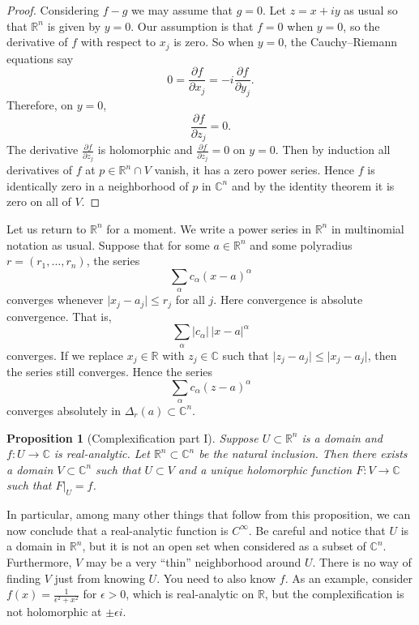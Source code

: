 \documentclass[12pt,openany]{book}
\newcommand{\sabs}[1]{\lvert {#1} \rvert}
\newcommand{\C}{{\mathbb{C}}}
\newcommand{\R}{{\mathbb{R}}}
\theoremstyle{plain}
\newtheorem{prop}[thm]{Proposition}
\theoremstyle{remark}
\theoremstyle{definition}
\theoremstyle{exercise}
\theoremstyle{example}
\begin{document}
\begin{proof}
Considering $f-g$ we may assume that $g=0$.
Let $z = x+iy$ as usual so that $\R^n$ is given by $y=0$.
Our assumption is that $f = 0$ when $y=0$,
so the derivative of $f$ with respect to $x_j$ is zero.
So when $y=0$,
the Cauchy--Riemann equations say
\begin{equation*}
0 = \frac{\partial f}{\partial x_j} =
-i \frac{\partial f}{\partial y_j} .
\end{equation*}
Therefore, on $y=0$,
\begin{equation*}
\frac{\partial f }{\partial z_j} = 0 .
\end{equation*}
The derivative $\frac{\partial f }{\partial z_j}$ is holomorphic
and $\frac{\partial f }{\partial z_j} = 0$ on $y=0$.  Then
by induction all derivatives of $f$ at $p \in \R^n \cap V$ vanish, it has a zero 
power series.  Hence $f$ is identically zero in a neighborhood of
$p$ in $\C^n$ and by the identity theorem it is zero on all of $V$.
\end{proof}


Let us return to $\R^n$ for a moment.
We write a power series in $\R^n$ in multinomial notation as usual.
Suppose that for some
$a \in \R^n$
and some polyradius
$r=(r_1,\ldots,r_n)$,
the series
\begin{equation*}
\sum_{\alpha} c_{\alpha} {(x-a)}^\alpha
\end{equation*}
converges whenever $\sabs{x_j-a_j} \leq r_j$ for all $j$.
Here convergence is absolute convergence.  That is,
\begin{equation*}
\sum_{\alpha} \sabs{c_{\alpha}}\, \sabs{x-a}^\alpha
\end{equation*}
converges.
If we replace $x_j \in \R$ with $z_j \in \C$ such that
$\sabs{z_j-a_j} \leq \sabs{x_j-a_j}$, then the series still converges.
Hence the series
\begin{equation*}
\sum_{\alpha} c_{\alpha} {(z-a)}^\alpha
\end{equation*}
converges absolutely in $\Delta_r(a) \subset \C^n$.

\begin{prop}[Complexification part I]
Suppose $U \subset \R^n$ is a domain and
$f \colon U \to \C$ is real-analytic.
Let $\R^n \subset \C^n$ be the natural inclusion.
Then there exists a domain $V \subset \C^n$ such that $U \subset V$
and a unique holomorphic function $F \colon V \to \C$ such that $F|_U = f$.
\end{prop}

In particular, among many other things that follow from this proposition, we
can now conclude that a real-analytic function is $C^\infty$.  Be careful
and notice that $U$ is a domain in $\R^n$, but it is not an open set
when considered as a subset of $\C^n$.  Furthermore, $V$ may be a very
``thin'' neighborhood around $U$.  There is no way of finding $V$ just from
knowing $U$.  You need to also know $f$.
As an example, consider
$f(x) = \frac{1}{\epsilon^2+x^2}$ for $\epsilon > 0$, which is
real-analytic on $\R$, but the complexification is not holomorphic at $\pm
\epsilon i$.
\end{document}
